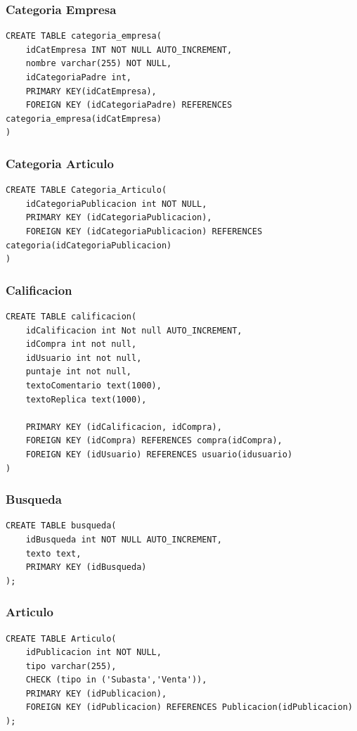 \documentclass[a4paper, 10pt, twoside]{article}
\begin{document}
\subsubsection{Categoria Empresa}
\begin{verbatim}
CREATE TABLE categoria_empresa(
	idCatEmpresa INT NOT NULL AUTO_INCREMENT,
	nombre varchar(255) NOT NULL,
    idCategoriaPadre int,
    PRIMARY KEY(idCatEmpresa),
    FOREIGN KEY (idCategoriaPadre) REFERENCES categoria_empresa(idCatEmpresa)
)
\end{verbatim}
\subsubsection{Categoria Articulo}
\begin{verbatim}
CREATE TABLE Categoria_Articulo(
	idCategoriaPublicacion int NOT NULL,
    PRIMARY KEY (idCategoriaPublicacion),
    FOREIGN KEY (idCategoriaPublicacion) REFERENCES categoria(idCategoriaPublicacion)
)
\end{verbatim}
\subsubsection{Calificacion}
\begin{verbatim}
CREATE TABLE calificacion(
	idCalificacion int Not null AUTO_INCREMENT,
    idCompra int not null,
    idUsuario int not null,
    puntaje int not null,
	textoComentario text(1000),
    textoReplica text(1000),
    
    PRIMARY KEY (idCalificacion, idCompra),
    FOREIGN KEY (idCompra) REFERENCES compra(idCompra),
    FOREIGN KEY (idUsuario) REFERENCES usuario(idusuario)
)
\end{verbatim}
\subsubsection{Busqueda}
\begin{verbatim}
CREATE TABLE busqueda(
	idBusqueda int NOT NULL AUTO_INCREMENT,
	texto text, 
	PRIMARY KEY	(idBusqueda)
);
\end{verbatim}
\subsubsection{Articulo}
\begin{verbatim}
CREATE TABLE Articulo(
	idPublicacion int NOT NULL,
	tipo varchar(255), 
	CHECK (tipo in ('Subasta','Venta')),
	PRIMARY KEY	(idPublicacion),
	FOREIGN KEY (idPublicacion) REFERENCES Publicacion(idPublicacion)
);
\end{verbatim}
\end{document}
